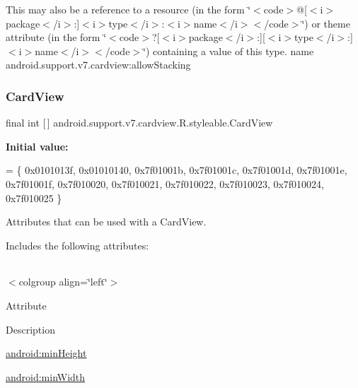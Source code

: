 This may also be a reference to a resource (in the form \char`\"{}$<$code$>$@\mbox{[}$<$i$>$package$<$/i$>$\+:\mbox{]}$<$i$>$type$<$/i$>$\+:$<$i$>$name$<$/i$>$$<$/code$>$\char`\"{}) or theme attribute (in the form \char`\"{}$<$code$>$?\mbox{[}$<$i$>$package$<$/i$>$\+:\mbox{]}\mbox{[}$<$i$>$type$<$/i$>$\+:\mbox{]}$<$i$>$name$<$/i$>$$<$/code$>$\char`\"{}) containing a value of this type.  name android.\+support.\+v7.\+cardview\+:allow\+Stacking \mbox{\label{classandroid_1_1support_1_1v7_1_1cardview_1_1R_1_1styleable_ad08b98a07471f174f404c58941fc82ca}} 
\subsubsection{\texorpdfstring{Card\+View}{CardView}}
{\footnotesize\ttfamily final int \mbox{[}$\,$\mbox{]} android.\+support.\+v7.\+cardview.\+R.\+styleable.\+Card\+View\hspace{0.3cm}{\ttfamily [static]}}

{\bfseries Initial value\+:}
\begin{DoxyCode}
= \{
            0x0101013f, 0x01010140, 0x7f01001b, 0x7f01001c,
            0x7f01001d, 0x7f01001e, 0x7f01001f, 0x7f010020,
            0x7f010021, 0x7f010022, 0x7f010023, 0x7f010024,
            0x7f010025
        \}
\end{DoxyCode}
Attributes that can be used with a Card\+View. 

Includes the following attributes\+:

\tabulinesep=1mm
\begin{longtabu} spread 0pt [c]{*{0}{|X[-1]}|}
\hline
\end{longtabu}
$<$colgroup align=\char`\"{}left\char`\"{}$>$ 

Attribute

Description 

{\ttfamily \hyperlink{classandroid_1_1support_1_1v7_1_1cardview_1_1R_1_1styleable_ac257bacd270670d3fc6bfd460d3040b4}{android\+:min\+Height}}

{\ttfamily \hyperlink{classandroid_1_1support_1_1v7_1_1cardview_1_1R_1_1styleable_a165f6907e0358c9373fd46989c5eaffc}{android\+:min\+Width}}

